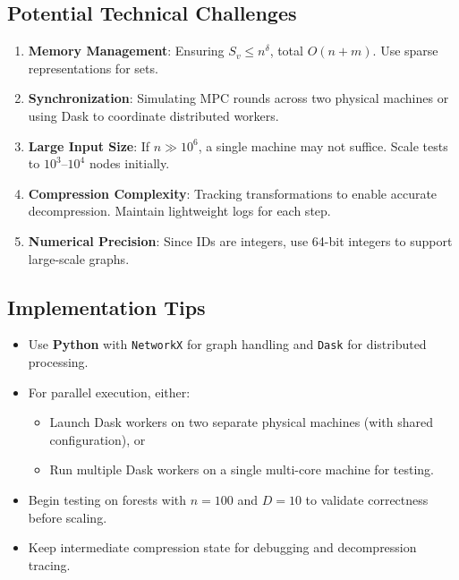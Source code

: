 \documentclass[11pt]{article}
\begin{document}
\subsection{Potential Technical Challenges}
\begin{enumerate}
    \item \textbf{Memory Management}: Ensuring \(S_v \leq n^\delta\), total \(O(n + m)\). Use sparse representations for sets.
    \item \textbf{Synchronization}: Simulating MPC rounds across two physical machines or using Dask to coordinate distributed workers.
    \item \textbf{Large Input Size}: If \(n \gg 10^6\), a single machine may not suffice. Scale tests to \(10^3\)--\(10^4\) nodes initially.
    \item \textbf{Compression Complexity}: Tracking transformations to enable accurate decompression. Maintain lightweight logs for each step.
    \item \textbf{Numerical Precision}: Since IDs are integers, use 64-bit integers to support large-scale graphs.
\end{enumerate}

\subsection{Implementation Tips}
\begin{itemize}
    \item Use \textbf{Python} with \texttt{NetworkX} for graph handling and \texttt{Dask} for distributed processing.
    \item For parallel execution, either:
        \begin{itemize}
            \item Launch Dask workers on two separate physical machines (with shared configuration), or
            \item Run multiple Dask workers on a single multi-core machine for testing.
        \end{itemize}
    \item Begin testing on forests with \(n = 100\) and \(D = 10\) to validate correctness before scaling.
    \item Keep intermediate compression state for debugging and decompression tracing.
\end{itemize}
\end{document}
